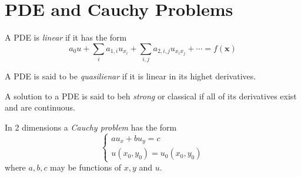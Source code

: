\section{PDE and Cauchy Problems}

\begin{defn}
  A PDE is \emph{linear} if it has the form
  \[
    a_0 u + \sum_{i} a_{1,i} u_{x_i}
    + \sum_{i,j} a_{2,i,j} u_{x_i x_j}
    + \cdots = f(\mathbf{x})
  \]
\end{defn}

\begin{defn}
  A PDE is said to be \emph{quasilienar} if it is linear in its highet
  derivatives.
\end{defn}

\begin{defn}
  A solution to a PDE is said to beh \emph{strong} or classical if all
  of its derivatives exist and are continuous.
\end{defn}

\begin{defn}
  \label{def:cauchy-2d}
  In 2 dimensions a \emph{Cauchy problem} has the form
  \begin{equation}
    \label{eqn:cauchy-2d}
    \begin{cases}
      a u_x  + bu_y = c \\
      u(x_0, y_0) = u_0(x_0, y_0)
    \end{cases}
  \end{equation}
  where $a, b, c$ may be functions of $x, y$ and $u$.
\end{defn}


